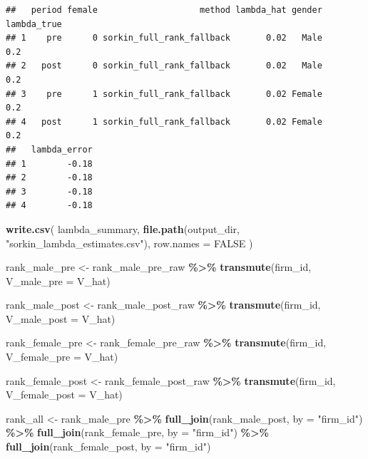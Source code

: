 \documentclass[
]{article}
\newenvironment{Shaded}{\begin{snugshade}}{\end{snugshade}}
\newcommand{\AttributeTok}[1]{\textcolor[rgb]{0.13,0.29,0.53}{#1}}
\newcommand{\ConstantTok}[1]{\textcolor[rgb]{0.56,0.35,0.01}{#1}}
\newcommand{\FunctionTok}[1]{\textcolor[rgb]{0.13,0.29,0.53}{\textbf{#1}}}
\newcommand{\NormalTok}[1]{#1}
\newcommand{\OtherTok}[1]{\textcolor[rgb]{0.56,0.35,0.01}{#1}}
\newcommand{\SpecialCharTok}[1]{\textcolor[rgb]{0.81,0.36,0.00}{\textbf{#1}}}
\newcommand{\StringTok}[1]{\textcolor[rgb]{0.31,0.60,0.02}{#1}}
\begin{document}
\begin{verbatim}
##   period female                    method lambda_hat gender lambda_true
## 1    pre      0 sorkin_full_rank_fallback       0.02   Male         0.2
## 2   post      0 sorkin_full_rank_fallback       0.02   Male         0.2
## 3    pre      1 sorkin_full_rank_fallback       0.02 Female         0.2
## 4   post      1 sorkin_full_rank_fallback       0.02 Female         0.2
##   lambda_error
## 1        -0.18
## 2        -0.18
## 3        -0.18
## 4        -0.18
\end{verbatim}

\begin{Shaded}
\begin{Highlighting}[]
\FunctionTok{write.csv}\NormalTok{(}
\NormalTok{    lambda\_summary,}
    \FunctionTok{file.path}\NormalTok{(output\_dir, }\StringTok{"sorkin\_lambda\_estimates.csv"}\NormalTok{),}
    \AttributeTok{row.names =} \ConstantTok{FALSE}
\NormalTok{)}

\NormalTok{rank\_male\_pre }\OtherTok{\textless{}{-}}\NormalTok{ rank\_male\_pre\_raw }\SpecialCharTok{\%\textgreater{}\%}
    \FunctionTok{transmute}\NormalTok{(firm\_id, }\AttributeTok{V\_male\_pre =}\NormalTok{ V\_hat)}

\NormalTok{rank\_male\_post }\OtherTok{\textless{}{-}}\NormalTok{ rank\_male\_post\_raw }\SpecialCharTok{\%\textgreater{}\%}
    \FunctionTok{transmute}\NormalTok{(firm\_id, }\AttributeTok{V\_male\_post =}\NormalTok{ V\_hat)}

\NormalTok{rank\_female\_pre }\OtherTok{\textless{}{-}}\NormalTok{ rank\_female\_pre\_raw }\SpecialCharTok{\%\textgreater{}\%}
    \FunctionTok{transmute}\NormalTok{(firm\_id, }\AttributeTok{V\_female\_pre =}\NormalTok{ V\_hat)}

\NormalTok{rank\_female\_post }\OtherTok{\textless{}{-}}\NormalTok{ rank\_female\_post\_raw }\SpecialCharTok{\%\textgreater{}\%}
    \FunctionTok{transmute}\NormalTok{(firm\_id, }\AttributeTok{V\_female\_post =}\NormalTok{ V\_hat)}

\NormalTok{rank\_all }\OtherTok{\textless{}{-}}\NormalTok{ rank\_male\_pre }\SpecialCharTok{\%\textgreater{}\%}
    \FunctionTok{full\_join}\NormalTok{(rank\_male\_post, }\AttributeTok{by =} \StringTok{"firm\_id"}\NormalTok{) }\SpecialCharTok{\%\textgreater{}\%}
    \FunctionTok{full\_join}\NormalTok{(rank\_female\_pre, }\AttributeTok{by =} \StringTok{"firm\_id"}\NormalTok{) }\SpecialCharTok{\%\textgreater{}\%}
    \FunctionTok{full\_join}\NormalTok{(rank\_female\_post, }\AttributeTok{by =} \StringTok{"firm\_id"}\NormalTok{)}


\end{Highlighting}
\end{Shaded}
\end{document}
